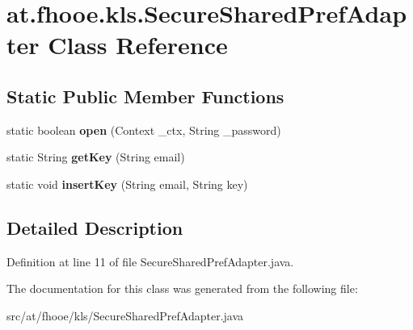 \hypertarget{classat_1_1fhooe_1_1kls_1_1_secure_shared_pref_adapter}{\section{at.\-fhooe.\-kls.\-Secure\-Shared\-Pref\-Adapter Class Reference}
\label{classat_1_1fhooe_1_1kls_1_1_secure_shared_pref_adapter}
}
\subsection*{Static Public Member Functions}
\begin{DoxyCompactItemize}
\item 
\hypertarget{classat_1_1fhooe_1_1kls_1_1_secure_shared_pref_adapter_a7430df041e5306d0e657bd8cb68c1140}{static boolean {\bfseries open} (Context \-\_\-ctx, String \-\_\-password)}\label{classat_1_1fhooe_1_1kls_1_1_secure_shared_pref_adapter_a7430df041e5306d0e657bd8cb68c1140}

\item 
\hypertarget{classat_1_1fhooe_1_1kls_1_1_secure_shared_pref_adapter_aee2b232e0d2a2e5f772b34d51f1325da}{static String {\bfseries get\-Key} (String email)}\label{classat_1_1fhooe_1_1kls_1_1_secure_shared_pref_adapter_aee2b232e0d2a2e5f772b34d51f1325da}

\item 
\hypertarget{classat_1_1fhooe_1_1kls_1_1_secure_shared_pref_adapter_ab117bdfa26f86ca528b31f1279eedecf}{static void {\bfseries insert\-Key} (String email, String key)}\label{classat_1_1fhooe_1_1kls_1_1_secure_shared_pref_adapter_ab117bdfa26f86ca528b31f1279eedecf}

\end{DoxyCompactItemize}


\subsection{Detailed Description}


Definition at line 11 of file Secure\-Shared\-Pref\-Adapter.\-java.



The documentation for this class was generated from the following file\-:\begin{DoxyCompactItemize}
\item 
src/at/fhooe/kls/Secure\-Shared\-Pref\-Adapter.\-java\end{DoxyCompactItemize}
